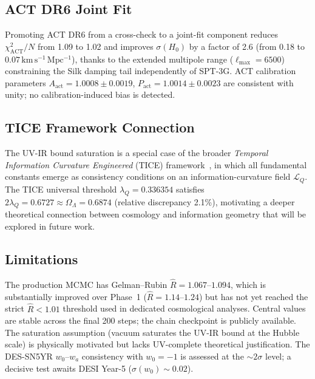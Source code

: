 \documentclass[12pt,a4paper]{article}
\newcommand{\OmL}{\Omega_\Lambda}
\newcommand{\kms}{\,\mathrm{km\,s^{-1}\,Mpc^{-1}}}
\begin{document}
\subsection{ACT DR6 Joint Fit}

Promoting ACT DR6 from a cross-check to a joint-fit component reduces
$\chi^2_\mathrm{ACT}/N$ from 1.09 to 1.02 and improves $\sigma(H_0)$ by
a factor of 2.6 (from 0.18 to $0.07\kms$), thanks to the extended
multipole range ($\ell_\mathrm{max} = 6500$) constraining the Silk
damping tail independently of SPT-3G.
ACT calibration parameters $A_\mathrm{act} = 1.0008 \pm 0.0019$,
$P_\mathrm{act} = 1.0014 \pm 0.0023$ are consistent with unity;
no calibration-induced bias is detected.

\subsection{TICE Framework Connection}

The UV-IR bound saturation is a special case of the broader
\emph{Temporal Information Curvature Engineered} (TICE) framework~\cite{Miller2025},
in which all fundamental constants emerge as consistency conditions on
an information-curvature field $\mathcal{L}_Q$.
The TICE universal threshold $\lambda_Q = 0.336354$ satisfies
$2\lambda_Q = 0.6727 \approx \OmL = 0.6874$ (relative discrepancy 2.1\%),
motivating a deeper theoretical connection between cosmology and
information geometry that will be explored in future work.

\subsection{Limitations}

The production MCMC has Gelman--Rubin $\hat{R} = 1.067$--$1.094$, which
is substantially improved over Phase~1 ($\hat{R} = 1.14$--$1.24$) but
has not yet reached the strict $\hat{R} < 1.01$ threshold used in
dedicated cosmological analyses.
Central values are stable across the final 200 steps;
the chain checkpoint is publicly available.
The saturation assumption (vacuum saturates the UV-IR bound at the Hubble
scale) is physically motivated but lacks UV-complete theoretical
justification.  The DES-SN5YR $w_0$--$w_a$ consistency with $w_0 = -1$
is assessed at the $\sim 2\sigma$ level; a decisive test awaits
DESI Year-5 ($\sigma(w_0) \sim 0.02$).

\end{document}
